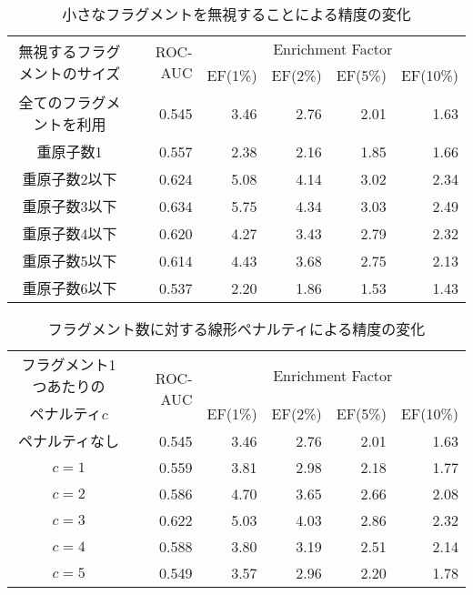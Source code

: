 \begin{table}[htb] \centering
	\caption{小さなフラグメントを無視することによる精度の変化}
	\label{table:omit}
	\begin{tabular}{c|rrrrr|}
	\multirow{2}{*}{無視するフラグメントのサイズ}	&\multirow{2}{*}{ROC-AUC}	&\multicolumn{4}{c|}{Enrichment Factor}				\\
										&						&EF(1\%)		&EF(2\%)		&EF(5\%)		&EF(10\%)	\\ \hline
	全てのフラグメントを利用					&0.545					&3.46		&2.76		&2.01		&1.63		\\
	重原子数1							&0.557					&2.38		&2.16		&1.85		&1.66		\\
	重原子数2以下						&0.624					&5.08		&4.14		&3.02		&2.34		\\
	重原子数3以下						&0.634					&5.75		&4.34		&3.03		&2.49		\\
	重原子数4以下						&0.620					&4.27		&3.43		&2.79		&2.32		\\
	重原子数5以下						&0.614					&4.43		&3.68		&2.75		&2.13		\\
	重原子数6以下						&0.537					&2.20		&1.86		&1.53		&1.43		\\ \hline
	\end{tabular}
\end{table}
\begin{table}[htb] \centering
	\caption{フラグメント数に対する線形ペナルティによる精度の変化}
	\label{table:penalty}
	\begin{tabular}{c|rrrrr|}
	フラグメント1つあたりの	&\multirow{2}{*}{ROC-AUC}	&\multicolumn{4}{c|}{Enrichment Factor}				\\
	ペナルティ$c$			&						&EF(1\%)		&EF(2\%)		&EF(5\%)		&EF(10\%)	\\ \hline
	ペナルティなし			&0.545					&3.46		&2.76		&2.01		&1.63		\\
	$c=1$				&0.559					&3.81		&2.98		&2.18		&1.77		\\
	$c=2$				&0.586					&4.70		&3.65		&2.66		&2.08		\\
	$c=3$				&0.622					&5.03		&4.03		&2.86		&2.32		\\
	$c=4$				&0.588					&3.80		&3.19		&2.51		&2.14		\\
	$c=5$				&0.549					&3.57		&2.96		&2.20		&1.78		\\ \hline
	\end{tabular}
\end{table}



